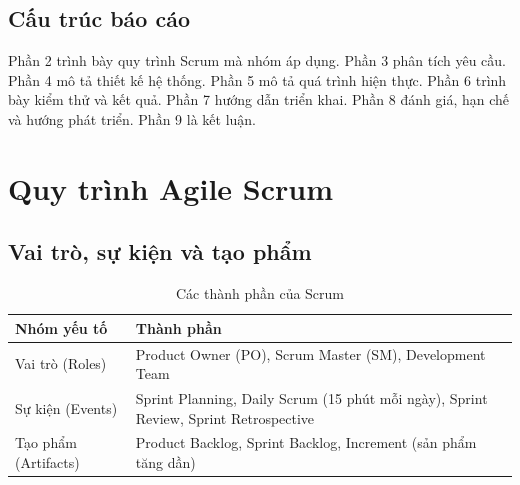 \documentclass[a4paper]{article}
\begin{document}
\subsection{Cấu trúc báo cáo}
Phần 2 trình bày quy trình Scrum mà nhóm áp dụng. Phần 3 phân tích yêu cầu. Phần 4 mô tả thiết kế hệ thống. Phần 5 mô tả quá trình hiện thực. Phần 6 trình bày kiểm thử và kết quả. Phần 7 hướng dẫn triển khai. Phần 8 đánh giá, hạn chế và hướng phát triển. Phần 9 là kết luận.

\newpage
\section{Quy trình Agile Scrum}
\subsection{Vai trò, sự kiện và tạo phẩm}
\begin{table}[h!]
\centering
\begin{tabularx}{\textwidth}{|l|X|}
\hline
\textbf{Nhóm yếu tố} & \textbf{Thành phần} \\ \hline
Vai trò (Roles) & Product Owner (PO), Scrum Master (SM), Development Team \\ \hline
Sự kiện (Events) & Sprint Planning, Daily Scrum (15 phút mỗi ngày), Sprint Review, Sprint Retrospective \\ \hline
Tạo phẩm (Artifacts) & Product Backlog, Sprint Backlog, Increment (sản phẩm tăng dần) \\ \hline
\end{tabularx}
\caption{Các thành phần của Scrum}
\end{table}
\end{document}

